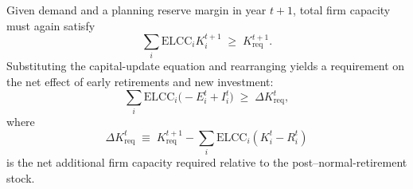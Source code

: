 \documentclass[preprint,authoryear,12pt]{elsarticle}
\begin{document}
Given demand and a planning reserve margin in year $t\!+\!1$, total firm
capacity must again satisfy
\begin{equation}
\sum_i \mathrm{ELCC}_i K_i^{t+1} \;\ge\; K_{\mathrm{req}}^{t+1}.
\end{equation}
Substituting the capital-update equation and rearranging yields a
requirement on the net effect of early retirements and new investment:
\begin{equation}
\sum_i \mathrm{ELCC}_i\bigl(-E_i^t + I_i^t\bigr)
\;\ge\;
\Delta K_{\mathrm{req}}^t,
\end{equation}
where
\begin{equation}
\Delta K_{\mathrm{req}}^t
\;\equiv\;
K_{\mathrm{req}}^{t+1}
-
\sum_i \mathrm{ELCC}_i (K_i^t - R_i^t)
\end{equation}
is the net additional firm capacity required relative to
the post–normal-retirement stock.
\end{document}
